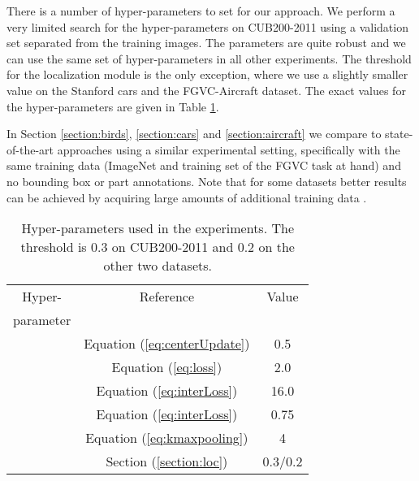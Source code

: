 \documentclass[10pt,twocolumn,letterpaper]{article}
\begin{document}
There is a number of hyper-parameters to set for our approach. We perform a very limited search for the hyper-parameters on CUB200-2011 using a validation set separated from the training images. The parameters are quite robust and we can use the same set of hyper-parameters in all other experiments. The threshold  for the localization module is the only exception, where we use a slightly smaller value on the Stanford cars and the FGVC-Aircraft dataset. The exact values for the hyper-parameters are given in Table \ref{table:params}.

In Section \ref{section:birds}, \ref{section:cars} and \ref{section:aircraft} we compare to state-of-the-art approaches using a similar experimental setting, specifically with the same training data (ImageNet and training set of the FGVC task at hand) and no bounding box or part annotations. Note that for some datasets better results can be achieved by acquiring large amounts of additional training data \cite{cui2018large,krause2016unreasonable}. 

\begin{table}
  \begin{center}
  \begin{tabular} {|c|c|c|}
    \hline
    Hyper-    & Reference & Value \\
    parameter &           & \\
    \hline
    \hline
        & Equation (\ref{eq:centerUpdate}) & 0.5 \\
       & Equation (\ref{eq:loss}) & 2.0\\
       & Equation (\ref{eq:interLoss}) & 16.0 \\
            & Equation (\ref{eq:interLoss}) & 0.75 \\
            & Equation (\ref{eq:kmaxpooling}) &  4\\
         & Section (\ref{section:loc})& 0.3/0.2\\
    \hline
  \end{tabular}
  \end{center}
  \caption{Hyper-parameters used in the experiments. The threshold  is 0.3 on CUB200-2011 and 0.2 on the other two datasets.}
  \label{table:params}
\end{table}
\end{document}
